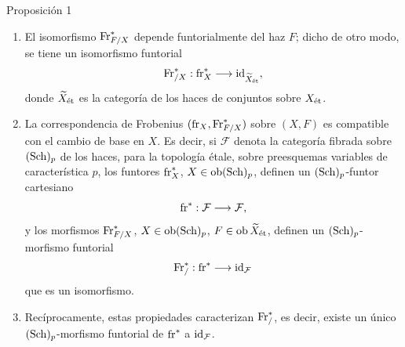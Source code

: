 \begin{statement}{Proposición 1}
\begin{enumerate}[label=\alph*)]
\item El isomorfismo $\operatorname{Fr}^*_{F/X}$ depende funtorialmente del haz $F$; dicho de otro modo, se tiene un isomorfismo funtorial
\[
\operatorname{Fr}^*_{/X}:\operatorname{fr}_X^*\longrightarrow \operatorname{id}_{\widetilde X_{\mathrm{\acute{e}t}}},
\]
donde $\widetilde X_{\mathrm{\acute{e}t}}$ es la categoría de los haces de conjuntos sobre $X_{\mathrm{\acute{e}t}}$.
\item La correspondencia de Frobenius $(\operatorname{fr}_X,\operatorname{Fr}^*_{F/X})$ sobre $(X,F)$ es compatible con el cambio de base en $X$. Es decir, si $\mathcal F$ denota la categoría fibrada sobre $(\operatorname{Sch})_p$ de los haces, para la topología étale, sobre preesquemas variables de característica $p$, los funtores $\operatorname{fr}_X^*$, $X\in\operatorname{ob}(\operatorname{Sch})_p$, definen un $(\operatorname{Sch})_p$-funtor cartesiano
\[
\operatorname{fr}^*: \mathcal F\longrightarrow\mathcal F,
\]
y los morfismos $\operatorname{Fr}^*_{F/X}$, $X\in\operatorname{ob}(\operatorname{Sch})_p$, $F\in\operatorname{ob}\widetilde X_{\mathrm{\acute{e}t}}$, definen un $(\operatorname{Sch})_p$-morfismo funtorial
\[
\operatorname{Fr}^*_{/}:\operatorname{fr}^*\longrightarrow\operatorname{id}_{\mathcal F}
\]
que es un isomorfismo.
\item Recíprocamente, estas propiedades caracterizan $\operatorname{Fr}^*_{/}$, es decir, existe un único $(\operatorname{Sch})_p$-morfismo funtorial de $\operatorname{fr}^*$ a $\operatorname{id}_{\mathcal F}$.
\end{enumerate}
\end{statement}
